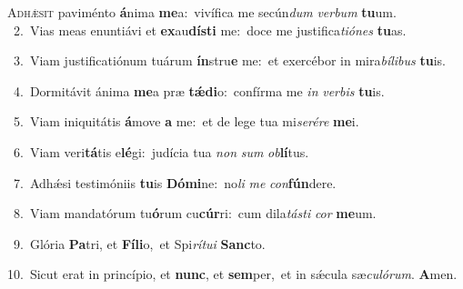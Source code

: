 \lettrine{\initial\textcolor{\initialcolor}{A}}{dhǽsit} paviménto \textbf{á}\-nima \textbf{me}\-a:~\star vivífica me secún\textit{dum} \textit{ver}\-\textit{bum} \textbf{tu}\-um.\\
{\numbfont\textcolor{\numbcolor}{~2.}}~Vias meas enuntiávi et \textbf{ex}\-au\-\textbf{dís}\-\textbf{ti} me:~\star doce me justifica\-\textit{ti}\-\textit{ó}\textit{nes} \textbf{tu}\-as.\par
{\numbfont\textcolor{\numbcolor}{~3.}}~Viam justificatiónum tuárum \textbf{ín}\-stru\textbf{e} me:~\star et exercébor in mira\-\textit{bí}\-\textit{li}\textit{bus} \textbf{tu}\-is.\par
{\numbfont\textcolor{\numbcolor}{~4.}}~Dormitávit ánima \textbf{me}\-a præ \textbf{tǽ}\-\textbf{di}o:~\star confírma me \textit{in} \textit{ver}\-\textit{bis} \textbf{tu}\-is.\par
{\numbfont\textcolor{\numbcolor}{~5.}}~Viam iniquitátis \textbf{á}\-move \textbf{a} me:~\star et de lege tua mi\-\textit{se}\-\textit{ré}\textit{re} \textbf{me}\-i.\par
{\numbfont\textcolor{\numbcolor}{~6.}}~Viam veri\-\textbf{tá}\-tis e\-\textbf{lé}\-gi:~\star judícia tua \textit{non} \textit{sum} \textit{ob}\-\textbf{lí}tus.\par
{\numbfont\textcolor{\numbcolor}{~7.}}~Adhǽsi testimóniis \textbf{tu}\-is \textbf{Dó}\-\textbf{mi}ne:~\star no\textit{li} \textit{me} \textit{con}\-\textbf{fún}dere.\par
{\numbfont\textcolor{\numbcolor}{~8.}}~Viam mandatórum tu\-\textbf{ó}\-rum cu\-\textbf{cúr}\-ri:~\star cum dila\-\textit{tás}\-\textit{ti} \textit{cor} \textbf{me}\-um.\par
{\numbfont\textcolor{\numbcolor}{~9.}}~Glória \textbf{Pa}\-tri, et \textbf{Fí}\-\textbf{li}o,~\star et Spi\-\textit{rí}\-\textit{tu}\textit{i} \textbf{Sanc}\-to.\par
{\numbfont\textcolor{\numbcolor}{10.}}~Sicut erat in princípio, et \textbf{nunc}\-, et \textbf{sem}\-per,~\star et in sǽcula sæ\-\textit{cu}\-\textit{ló}\textit{rum}. \textbf{A}\-men.\par

